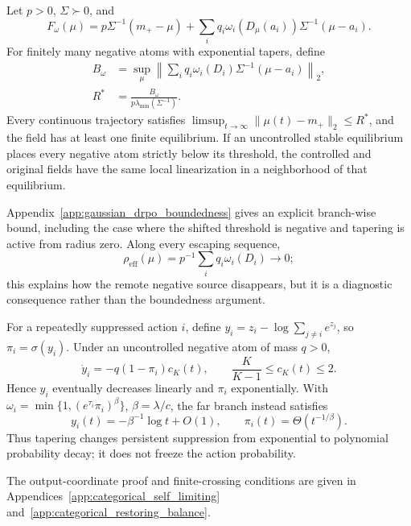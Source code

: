 \documentclass[sigconf,anonymous,review]{acmart}
\theoremstyle{acmdefinition}
\begin{document}
\begin{theorem}
\label{thm:gaussian_drpo_boundedness}
Let \(p>0\), \(\Sigma\succ0\), and
\[
F_\omega(\mu)=p\Sigma^{-1}(m_+-\mu)
+\sum_iq_i\omega_i(D_\mu(a_i))\Sigma^{-1}(\mu-a_i).
\]
For finitely many negative atoms with exponential tapers, define
\begin{equation}
\begin{aligned}
B_\omega&=\sup_\mu\left\|\sum_iq_i\omega_i(D_i)
\Sigma^{-1}(\mu-a_i)\right\|_2,\\
R^*&=\frac{B_\omega}{p\lambda_{\min}(\Sigma^{-1})}.
\end{aligned}
\label{eq:gaussian_bound_radius}
\end{equation}
Every continuous trajectory satisfies
\(\limsup_{t\to\infty}\|\mu(t)-m_+\|_2\le R^*\), and the field has at
least one finite equilibrium. If an uncontrolled stable equilibrium
places every negative atom strictly below its threshold, the controlled
and original fields have the same local linearization in a neighborhood of
that equilibrium.
\end{theorem}

Appendix~\ref{app:gaussian_drpo_boundedness} gives an explicit
branch-wise bound, including the case where the shifted threshold is
negative and tapering is active from radius zero. Along every escaping
sequence,
\[
\rho_{\mathrm{eff}}(\mu)
=
p^{-1}\sum_i q_i\omega_i(D_i)
\longrightarrow 0;
\]
this explains how the remote negative source disappears, but it is a
diagnostic consequence rather than the boundedness argument.

\begin{theorem}
\label{thm:categorical_self_limiting}
For a repeatedly suppressed action \(i\), define
\(y_i=z_i-\log\sum_{j\ne i}e^{z_j}\), so \(\pi_i=\sigma(y_i)\).
Under an uncontrolled negative atom of mass \(q>0\),
\[
\dot y_i=-q(1-\pi_i)c_K(t),
\qquad \frac K{K-1}\le c_K(t)\le2.
\]
Hence \(y_i\) eventually decreases linearly and \(\pi_i\) exponentially.
With \(\omega_i=\min\{1,(e^{\tau_i}\pi_i)^\beta\}\),
\(\beta=\lambda/c\), the far branch instead satisfies
\[
y_i(t)=-\beta^{-1}\log t+O(1),
\qquad \pi_i(t)=\Theta(t^{-1/\beta}).
\]
Thus tapering changes persistent suppression from exponential to
polynomial probability decay; it does not freeze the action probability.
\end{theorem}

The output-coordinate proof and finite-crossing conditions are given in
Appendices~\ref{app:categorical_self_limiting}
and~\ref{app:categorical_restoring_balance}.
\end{document}
